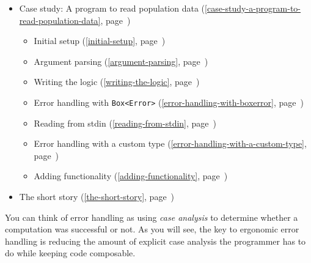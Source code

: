 \documentclass[a4paper,]{book}
\renewcommand*{\hyperref}[2][\ar]{%
  \def\ar{#2}%
  #2 (\autoref{#1}, page~\pageref{#1})}
\begin{document}
\begin{itemize}
  \begin{itemize}
  \itemsep1pt\parskip0pt
  \item
    \hyperref[the-error-trait]{The \texttt{Error} trait}
  \item
    \hyperref[the-from-trait]{The \texttt{From} trait}
  \item
    \hyperref[the-real-try-macro]{The real \texttt{try!} macro}
  \item
    \hyperref[composing-custom-error-types]{Composing custom error
    types}
  \item
    \hyperref[advice-for-library-writers]{Advice for library writers}
  \end{itemize}
\item
  \hyperref[case-study-a-program-to-read-population-data]{Case study: A
  program to read population data}

  \begin{itemize}
  \itemsep1pt\parskip0pt
  \item
    \hyperref[initial-setup]{Initial setup}
  \item
    \hyperref[argument-parsing]{Argument parsing}
  \item
    \hyperref[writing-the-logic]{Writing the logic}
  \item
    \hyperref[error-handling-with-boxerror]{Error handling with
    \texttt{Box\textless{}Error\textgreater{}}}
  \item
    \hyperref[reading-from-stdin]{Reading from stdin}
  \item
    \hyperref[error-handling-with-a-custom-type]{Error handling with a
    custom type}
  \item
    \hyperref[adding-functionality]{Adding functionality}
  \end{itemize}
\item
  \hyperref[the-short-story]{The short story}
\end{itemize}


You can think of error handling as using \emph{case analysis} to
determine whether a computation was successful or not. As you will see,
the key to ergonomic error handling is reducing the amount of explicit
case analysis the programmer has to do while keeping code composable.
\end{document}
